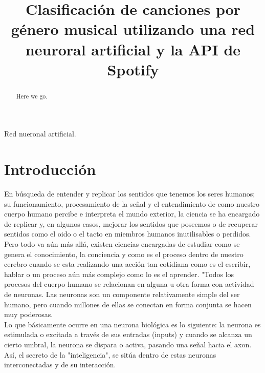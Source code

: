 \documentclass[conference]{IEEEtran}
\begin{document}
\title{  Clasificación de canciones por género musical utilizando una red neuroral artificial y la API de Spotify }
\author{

\and
{}
}

\maketitle
\renewcommand\abstractname{Abstract}
\begin{abstract}
Here we go. \\
\end{abstract}



\begin{IEEEkeywords}
Red nueronal artificial.
\end{IEEEkeywords}

\tableofcontents

\IEEEpeerreviewmaketitle
\section{Introducción}
En búsqueda  de entender y replicar los sentidos que tenemos los seres humanos; su funcionamiento, procesamiento de la señal y el entendimiento de como nuestro cuerpo humano percibe e interpreta el mundo exterior, la ciencia se ha encargado de replicar y, en algunos casos, mejorar los sentidos que poseemos o de recuperar sentidos como el oido o el tacto en miembros humanos inutilisables o perdidos. Pero todo va aún más allá, existen ciencias encargadas de estudiar como se genera el conocimiento, la conciencia y como es el proceso dentro de nuestro cerebro cuando se esta realizando una acción tan cotidiana como es el escribir, hablar o un proceso aún más complejo como lo es el aprender. "Todos los procesos del cuerpo humano se relacionan en alguna u otra forma con actividad de neuronas. Las neuronas son un componente relativamente simple del ser humano, pero cuando millones de ellas se conectan en forma conjunta se hacen muy poderosas. \\
Lo que básicamente ocurre en una neurona biológica es lo siguiente: la neurona es estimulada o excitada a través de sus entradas (inputs) y cuando se alcanza un cierto umbral, la neurona se dispara o activa, pasando una señal hacia el axon. Así, el secreto de la "inteligencia", se sitúa dentro de estas neuronas interconectadas y de su interacción.\\
\end{document}
